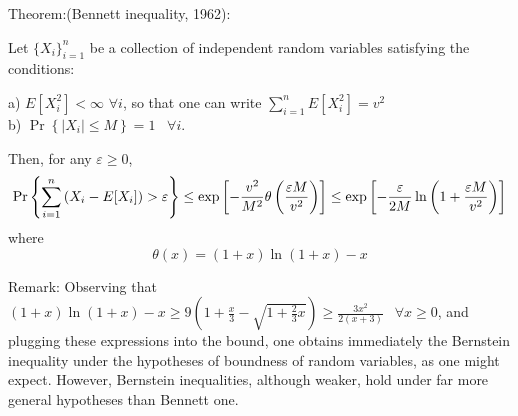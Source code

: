 \documentclass[12pt]{article}
\begin{document}
Theorem:(Bennett inequality, 1962):

Let $\{X_{i}\}_{i=1}^{n}$ be a collection of independent random
variables satisfying the conditions:

a) $E[X_{i}^{2}]<\infty $ $\forall i$, so that one can write $%
\sum_{i=1}^{n}E[X_{i}^{2}]=v^{2}$ \\
b) $\Pr\left\{\left\vert X_{i}\right\vert \leq M\right\} =1$ \ $\forall i$.

Then, for any $\varepsilon \geq 0$,
\[
\Pr\left\{ \sum_{i=1}^{n}\left( X_{i}-E[X_{i}]\right) >\varepsilon \right\}
\leq \exp \left[ -\frac{v^{2}}{M^{2}}\theta \left( \frac{\varepsilon M}{v^{2}%
}\right) \right] \leq \exp \left[ -\frac{\varepsilon }{2M}\ln \left( 1+\frac{%
\varepsilon M}{v^{2}}\right) \right] 
\]
where
\[
\theta \left( x\right) =\left( 1+x\right) \ln \left( 1+x\right) -x 
\]

Remark:
Observing that $\left( 1+x\right) \ln \left( 1+x\right) -x\geq 9\left( 1+%
\frac{x}{3}-\sqrt{1+\frac{2}{3}x}\right) \geq \frac{3x^{2}}{2\left(
x+3\right) }$ $\ \ \forall x\geq 0$, and plugging these expressions into the
bound, one obtains immediately the Bernstein inequality under the hypotheses of
boundness of random variables, as one might expect. However, Bernstein
inequalities, although weaker, hold under far more general hypotheses than
Bennett one.
\end{document}

